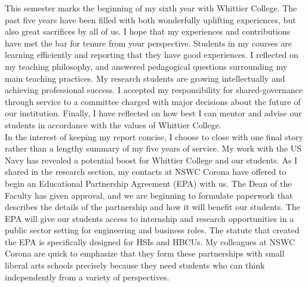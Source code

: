 \documentclass[../main.tex]{subfiles}
\begin{document}
This semester marks the beginning of my sixth year with Whittier College.  The past five years have been filled with both wonderfully uplifting experiences, but also great sacrifices by all of us.  I hope that my experiences and contributions have met the bar for tenure from your perspective.  Students in my courses are learning efficiently and reporting that they have good experiences.  I reflected on my teaching philosophy, and answered pedagogical questions surrounding my main teaching practices.  My research students are growing intellectually and achieving professional success.  I accepted my responsibility for shared-governance through service to a committee charged with major decisions about the future of our institution.  Finally, I have reflected on how best I can mentor and advise our students in accordance with the values of Whittier College. 
\\
\vspace{0.25cm}
In the interest of keeping my report concise, I choose to close with one final story rather than a lengthy summary of my five years of service.  My work with the US Navy has revealed a potential boost for Whittier College and our students.  As I shared in the research section, my contacts at NSWC Corona have offered to begin an Educational Partnership Agreement (EPA) with us.  The Dean of the Faculty has given approval, and we are beginning to formulate paperwork that describes the details of the partnership and how it will benefit our students.  The EPA will give our students access to internship and research opportunities in a public sector setting for engineering and business roles.  The statute that created the EPA is specifically designed for HSIs and HBCUs.  My colleagues at NSWC Corona are quick to emphasize that they form these partnerships with small liberal arts schools precisely because they need students who can think independently from a variety of perspectives.
\\
\vspace{0.25cm}
\end{document}
